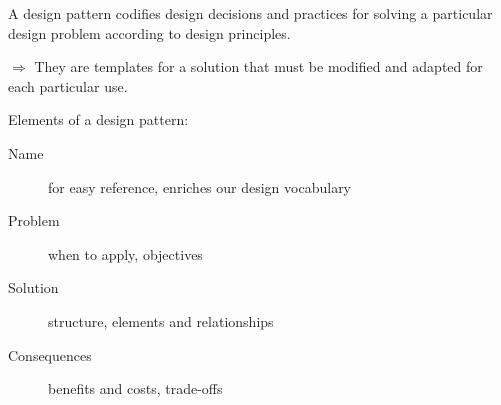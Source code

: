 A design pattern codifies design decisions and practices for solving a
particular design problem according to design principles.

$\Rightarrow$  They are templates for a solution that must be modified and adapted for
each particular use. 
\newline

Elements of a design pattern:

\begin{description}
    \item[Name] for easy reference, enriches our design vocabulary
    \item[Problem] when to apply, objectives
    \item[Solution] structure, elements and relationships
    \item[Consequences] benefits and costs, trade-offs
\end{description}


